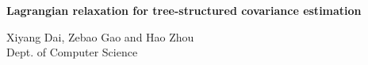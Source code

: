\documentclass[11pt, reqno]{amsart}
\begin{document}
\begin{center}
\textbf{Lagrangian relaxation for tree-structured covariance estimation}
\newline
\end{center}
\begin{flushright}
Xiyang Dai, Zebao Gao and Hao Zhou\\
Dept. of Computer Science
\end{flushright}






\end{document}

